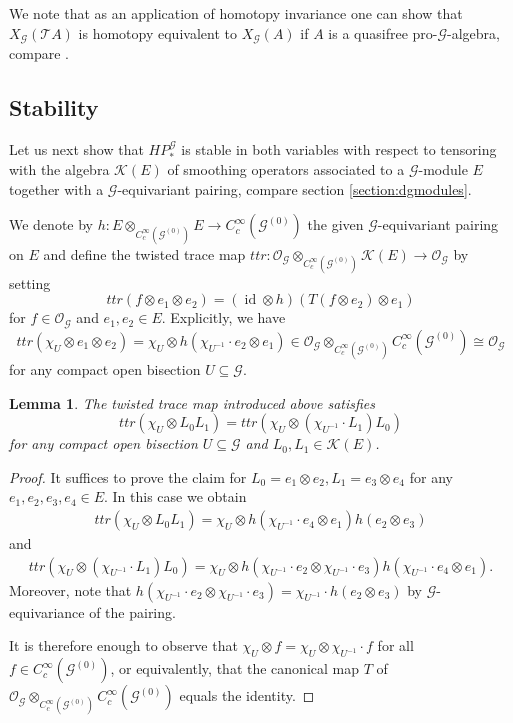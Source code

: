 \documentclass{amsart}
\newtheorem{lemma}[thm]{Lemma}
\newcommand{\G}{\mathcal{G}}
\newcommand{\K}{\mathcal{K}}
\newcommand{\T}{\mathcal{T}}
\newcommand{\OG}{\mathcal{O}_{\mathcal{G}}}
\newcommand{\ccinfty}{C_c^\infty}
\DeclareMathOperator{\id}{id}
\begin{document}
We note that as an application of homotopy invariance one can show that $ X_\G(\T A) $ is homotopy equivalent to $ X_\G(A) $ if $ A $ is a quasifree pro-$ \G $-algebra, compare  \cite[Proposition 10.5]{VOIGT_equivariantperiodiccyclichomology}. 

\subsection{Stability} \label{section:stability}

Let us next show that $ HP^\G_* $ is stable in both variables with respect to tensoring with the algebra $ \K(E) $ of smoothing operators associated to a $ \G $-module $ E $ together with a $ \G $-equivariant pairing, compare section \ref{section:dgmodules}. 

We denote by $ h: E \otimes_{\ccinfty(\G^{(0)})} E \rightarrow \ccinfty(\G^{(0)}) $ the given $ \G $-equivariant pairing on $ E $ and define the twisted trace map $ ttr: \OG \otimes_{\ccinfty(\G^{(0)})} \K(E) \rightarrow \OG $ by setting 
$$
ttr(f \otimes e_1 \otimes e_2) = (\id \otimes h)(T(f \otimes e_2) \otimes e_1)
$$
for $ f \in \OG $ and $ e_1, e_2 \in E $. Explicitly, we have 
$$
ttr(\chi_U \otimes e_1 \otimes e_2) = \chi_U \otimes h(\chi_{U^{-1}} \cdot e_2 \otimes e_1) \in \OG \otimes_{\ccinfty(\G^{(0)})} \ccinfty(\G^{(0)}) \cong \OG
$$
for any compact open bisection $ U \subseteq \G $. 

\begin{lemma} \label{twistedtrace}
The twisted trace map introduced above satisfies
$$
ttr(\chi_U \otimes L_0 L_1) = ttr(\chi_U \otimes (\chi_{U^{-1}}\cdot L_1) L_0)
$$
for any compact open bisection $ U \subseteq \G $ and $ L_0, L_1 \in \K(E) $.  
\end{lemma}

\begin{proof}
It suffices to prove the claim for $ L_0 = e_1 \otimes e_2, L_1 = e_3 \otimes e_4 $ for any $ e_1, e_2, e_3, e_4 \in E $. In this case we obtain 
\begin{align*}
ttr(\chi_U \otimes L_0 L_1) = \chi_U \otimes  h(\chi_{U^{-1}} \cdot e_4 \otimes e_1) h(e_2 \otimes e_3) 
\end{align*}
and 
\begin{align*}
ttr(\chi_U \otimes (\chi_{U^{-1}}\cdot L_1) L_0) = \chi_U \otimes h(\chi_{U^{-1}} \cdot e_2 \otimes \chi_{U^{-1}} \cdot e_3) h(\chi_{U^{-1}} \cdot e_4 \otimes e_1) . 
\end{align*}
Moreover, note that $ h(\chi_{U^{-1}} \cdot e_2 \otimes \chi_{U^{-1}} \cdot e_3) = \chi_{U^{-1}} \cdot h(e_2 \otimes e_3) $ by $ \G $-equivariance of the pairing. 

It is therefore enough to observe that $ \chi_U \otimes f = \chi_U \otimes \chi_{U^{-1}} \cdot f $ for all $ f \in \ccinfty(\G^{(0)}) $, or equivalently, that the canonical map $ T $ of $ \OG \otimes_{\ccinfty(\G^{(0)})} \ccinfty(\G^{(0)}) $ equals the identity. 
\end{proof}
\end{document}
